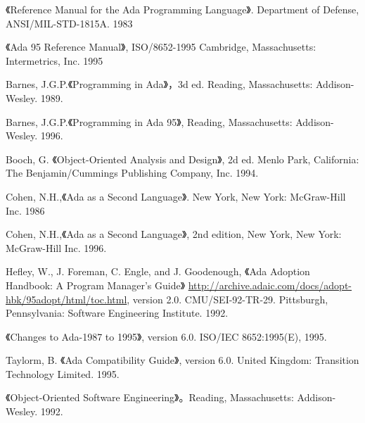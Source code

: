 %
%
%

\cleardoublepage
{}
\begin{thebibliography}{widest-label}\label{bib}

 《Reference Manual for the Ada Programming
Language》. Department of Defense, ANSI/MIL-STD-1815A. 1983

 《Ada 95 Reference Manual》,
ISO/8652-1995 Cambridge, Massachusetts: Intermetrics, Inc. 1995

 Barnes, J.G.P.《Programming in Ada》，3d ed.
Reading, Massachusetts: Addison-Wesley. 1989.

 Barnes, J.G.P.《Programming in Ada 95》,
Reading, Massachusetts: Addison-Wesley. 1996.

 Booch, G. 《Object-Oriented Analysis and
Design》, 2d ed. Menlo Park, California: The Benjamin/Cummings Publishing
Company, Inc. 1994.

 Cohen, N.H.,《Ada as a Second Language》.
 New York, New York: McGraw-Hill Inc. 1986

 Cohen, N.H.,《Ada as a Second Language》,
2nd edition, New York, New York: McGraw-Hill Inc. 1996.

 Hefley, W., J. Foreman, C. Engle, and
J. Goodenough, 《Ada Adoption Handbook: A Program Manager's Guide》
\url{http://archive.adaic.com/docs/adopt-hbk/95adopt/html/toc.html},
version 2.0. CMU/SEI-92-TR-29. Pittsburgh, Pennsylvania:
Software Engineering Institute. 1992.

 《Changes to Ada-1987 to 1995》,
version 6.0. ISO/IEC 8652:1995(E), 1995.

 Taylorm, B.
《Ada Compatibility Guide》, version 6.0. United Kingdom:
Transition Technology Limited. 1995.

 《Object-Oriented Software
Engineering》。Reading, Massachusetts: Addison-Wesley. 1992.


\end{thebibliography}
